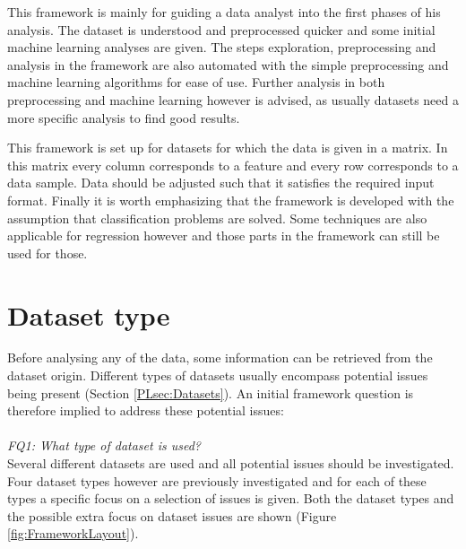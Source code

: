 \documentclass[10pt,a4paper]{report}
\begin{document}
	This framework is mainly for guiding a data analyst into the first phases of his analysis. The dataset is understood and preprocessed quicker and some initial machine learning analyses are given. The steps exploration, preprocessing and analysis in the framework are also automated with the simple preprocessing and machine learning algorithms for ease of use. Further analysis in both preprocessing and machine learning however is advised, as usually datasets need a more specific analysis to find good results. 
	
	This framework is set up for datasets for which the data is given in a matrix. In this matrix every column corresponds to a feature and every row corresponds to a data sample. Data should be adjusted such that it satisfies the required input format. Finally it is worth emphasizing that the framework is developed with the assumption that classification problems are solved. Some techniques are also applicable for regression however and those parts in the framework can still be used for those.
	
	\section{Dataset type}
	\label{FIsec:DatasetType}
	
	Before analysing any of the data, some information can be retrieved from the dataset origin. Different types of datasets usually encompass potential issues being present (Section \ref{PLsec:Datasets}). An initial framework question is therefore implied to address these potential issues: \\
	\\
	\emph{FQ1: What type of dataset is used?} \\

	Several different datasets are used and all potential issues should be investigated. Four dataset types however are previously investigated and for each of these types a specific focus on a selection of issues is given. Both the dataset types and the possible extra focus on dataset issues are shown (Figure \ref{fig:FrameworkLayout}).
	
\end{document}
